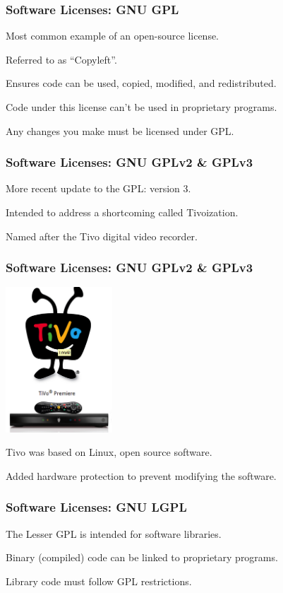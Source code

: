 \begin{frame}
\frametitle{Software Licenses: GNU GPL}

\begin{changemargin}{1cm}
Most common example of an open-source license.

Referred to as ``Copyleft''.

Ensures code can be used, copied, modified, and redistributed.

Code under this license can't be used in proprietary programs.

Any changes you make must be licensed under GPL.

\end{changemargin}
\end{frame}


\begin{frame}
\frametitle{Software Licenses: GNU GPLv2 \& GPLv3}

\begin{changemargin}{1cm}
More recent update to the GPL: version 3.

Intended to address a shortcoming called \alert{Tivoization}.

Named after the Tivo digital video recorder.

\end{changemargin}
\end{frame}

\begin{frame}
\frametitle{Software Licenses: GNU GPLv2 \& GPLv3}
\begin{center}
\includegraphics[width=0.3\textwidth]{images/tivo.png}
\end{center}

Tivo was based on Linux, open source software.
 
Added hardware protection to prevent modifying the software.

\end{frame}

\begin{frame}
\frametitle{Software Licenses: GNU LGPL}

\begin{changemargin}{1cm}
The Lesser GPL is intended for software libraries.

Binary (compiled) code can be linked to proprietary programs.

Library code must follow GPL restrictions.

\end{changemargin}
\end{frame}


